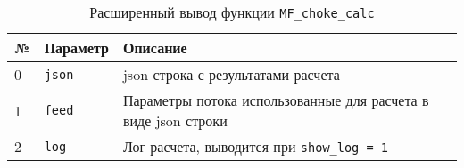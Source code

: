 \begin{table}[H]
	\caption{Расширенный вывод функции \texttt{MF_choke_calc} }
	\label{table:param_list_MF_choke_calc}
	\begin{tabular}{p{}p{}p{}}
		\hline
		№& Параметр & Описание  \\ \hline
		0 & \texttt{json} & json строка с результатами расчета  \\ \hline
		
		1 & \texttt{feed} & Параметры потока использованные для расчета в виде json строки\\ \hline
		2 & \texttt{log} & Лог расчета, выводится при \texttt{show_log = 1}  \\ \hline
		
	\end{tabular}
\end{table}
 
